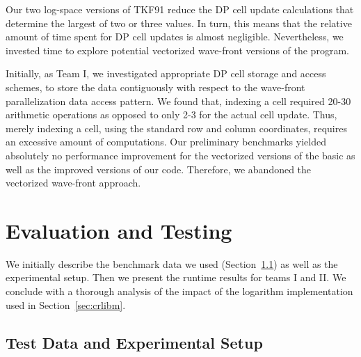 \documentclass[runningheads,a4paper]{llncs}
\begin{document}
Our two log-space versions of TKF91 reduce the DP cell update calculations that determine the largest of two or three values.
In turn, this means that the relative amount of time spent for DP cell updates is almost negligible.
Nevertheless, we invested time to explore potential vectorized wave-front versions of the program.

Initially, as Team I, we investigated appropriate DP cell storage and access schemes,
to store the data contiguously with respect to the wave-front parallelization data access pattern.
We found that, indexing a cell required 20-30 arithmetic operations as opposed to only 2-3 for the actual cell update.
Thus, merely indexing a cell, using the standard row and column coordinates, requires an excessive amount of computations.
Our preliminary benchmarks yielded absolutely no performance improvement for the vectorized versions of
the basic as well as the improved versions of our code.
Therefore, we abandoned the vectorized wave-front approach.


\section{Evaluation and Testing}
\label{sec:evaluation}

We initially describe the benchmark data we used (Section~\ref{ssec:benchmark}) as well as the experimental setup.
Then we present the runtime results for teams I and II. We conclude with a thorough analysis of the impact of the logarithm implementation used
in Section~\ref{sec:crlibm}.


\subsection{Test Data and Experimental Setup}
\label{ssec:benchmark}

\end{document}
